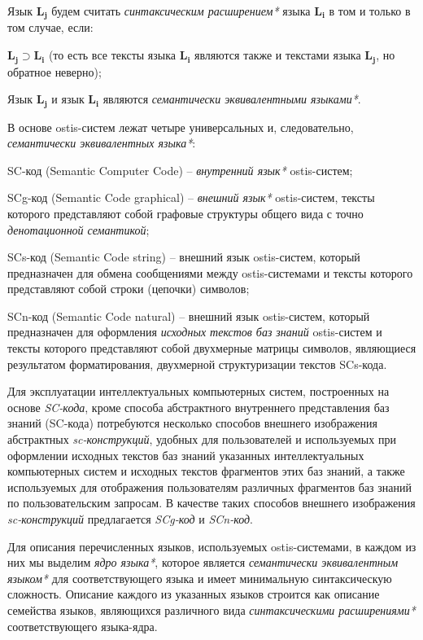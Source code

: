 \begin{SCn}
{Язык $\bm{L_j}$ будем считать \textit{синтаксическим расширением*} языка $\bm{L_i}$ в том и только в том случае, если:

\begin{scnitemize}
\item $\bm{L_j} \supset \bm{L_i}$ (то есть все тексты языка $\bm{L_i}$ являются также и текстами языка $\bm{L_j}$, но обратное неверно);
\item Язык $\bm{L_j}$ и язык $\bm{L_i}$ являются \textit{семантически эквивалентными языками*}.
\end{scnitemize}

В основе ostis-систем лежат четыре универсальных и, следовательно, \textit{семантически эквивалентных языка*}: 
\begin{scnitemize}
\item SC-код (Semantic Computer Code) -- \textit{внутренний язык*} ostis-систем; 
\item SCg-код (Semantic Code graphical) -- \textit{внешний язык*} ostis-систем, тексты которого представляют собой графовые структуры общего вида с точно \textit{денотационной семантикой};
\item SCs-код (Semantic Code string) -- внешний язык ostis-систем, который предназначен для обмена сообщениями между ostis-системами и тексты которого представляют собой строки (цепочки) символов;
\item SCn-код (Semantic Code natural) -- внешний язык ostis-систем, который предназначен для оформления \textit{исходных текстов баз знаний} ostis-систем и тексты которого представляют собой двухмерные матрицы символов, являющиеся результатом форматирования, двухмерной структуризации текстов SCs-кода.
\end{scnitemize}

Для эксплуатации интеллектуальных компьютерных систем,  построенных на основе \textit{SC-кода}, кроме способа абстрактного внутреннего представления баз знаний (SC-кода) потребуются несколько способов внешнего изображения абстрактных \textit{sc-конструкций}, удобных для пользователей и используемых при оформлении исходных текстов баз знаний указанных интеллектуальных компьютерных систем и исходных текстов фрагментов этих баз знаний, а также используемых для отображения пользователям различных фрагментов баз знаний по пользовательским запросам. В качестве таких способов внешнего изображения \textit{sc-конструкций} предлагается \textit{SCg-код} и \textit{SCn-код}.

Для описания перечисленных языков, используемых ostis-системами, в каждом из них мы выделим \textit{ядро языка*}, которое является \textit{семантически эквивалентным языком*} для соответствующего языка и имеет минимальную синтаксическую сложность. Описание каждого из указанных языков строится как описание семейства языков, являющихся различного вида \textit{синтаксическими расширениями*} соответствующего языка-ядра.
}

\end{SCn}






